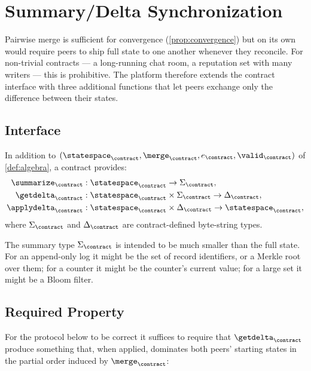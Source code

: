 \section{Summary/Delta Synchronization}
\label{sec:sync}

Pairwise merge is sufficient for convergence (\cref{prop:convergence}) but on its own would require peers to ship full state to one another whenever they reconcile. For non-trivial contracts --- a long-running chat room, a reputation set with many writers --- this is prohibitive. The platform therefore extends the contract interface with three additional functions that let peers exchange only the difference between their states.

\subsection{Interface}

\begin{definition}
\label{def:sync}
In addition to $(\statespace_\contract, \merge_\contract, e_\contract, \valid_\contract)$ of \cref{def:algebra}, a contract provides:
\begin{align*}
  \summarize_\contract &: \statespace_\contract \to \Sigma_\contract,\\
  \getdelta_\contract &: \statespace_\contract \times \Sigma_\contract \to \Delta_\contract,\\
  \applydelta_\contract &: \statespace_\contract \times \Delta_\contract \to \statespace_\contract,
\end{align*}
where $\Sigma_\contract$ and $\Delta_\contract$ are contract-defined byte-string types.
\end{definition}

The summary type $\Sigma_\contract$ is intended to be much smaller than the full state. For an append-only log it might be the set of record identifiers, or a Merkle root over them; for a counter it might be the counter's current value; for a large set it might be a Bloom filter.

\subsection{Required Property}

For the protocol below to be correct it suffices to require that $\getdelta_\contract$ produce something that, when applied, dominates both peers' starting states in the partial order induced by $\merge_\contract$:

